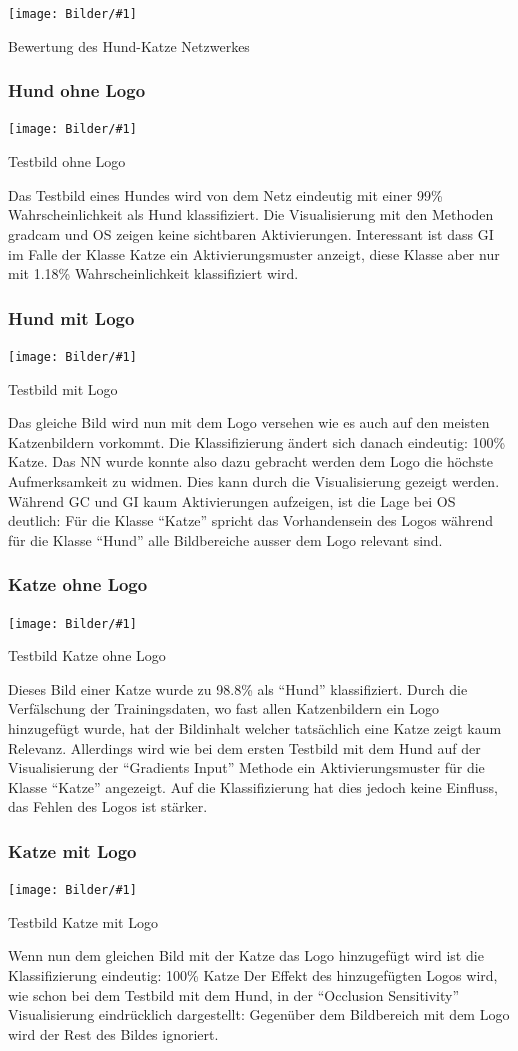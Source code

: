 \documentclass[
  12pt, %
  a4paper, %
  oneside, %
  openany, 
  numbers=noenddot, %
  BCOR=5mm, %
  parskip=half*, %
  thesis, %
]{bfhbook}
\newcommand{\imgText}[3]{
\begin{center}
    \begin{minipage}[t]{0.6\textwidth}
    		\vspace{0pt}
		\texttt{[image: Bilder/\#1]}
		\caption{#2}
	\end{minipage}\hfill
    \begin{minipage}[t]{0.4\textwidth}
    		\vspace{5pt}
  		#3
    \end{minipage}
\end{center}
}
\begin{document}
\imgText{Training-Manipulated-StatisticsTable.png}{Bewertung des Hund-Katze Netzwerkes}{

}

\subsubsection*{Hund ohne Logo}
\imgText{Manipulated_case_img7.png}{Testbild ohne Logo}{
Das Testbild eines Hundes wird von dem Netz eindeutig mit einer 99\% Wahrscheinlichkeit als Hund klassifiziert.
\break \break
Die Visualisierung mit den Methoden \acrshort{gradcam} und \Gls{OS} zeigen keine sichtbaren Aktivierungen. 
Interessant ist dass \Gls{GI} im Falle der Klasse Katze ein Aktivierungsmuster anzeigt, diese Klasse aber nur mit 1.18\% Wahrscheinlichkeit klassifiziert wird.
}

\subsubsection*{Hund mit Logo}
\imgText{Manipulated_case_img8.png}{Testbild mit Logo}{
Das gleiche Bild wird nun mit dem Logo versehen wie es auch auf den meisten Katzenbildern vorkommt. \break \break 
Die Klassifizierung ändert sich danach eindeutig: 100\% Katze. Das \Gls{NN} wurde konnte also dazu gebracht werden dem Logo die höchste Aufmerksamkeit zu widmen. 
\break \break
Dies kann durch die Visualisierung gezeigt werden. Während \Gls{GC} und \Gls{GI} kaum Aktivierungen aufzeigen, ist die Lage bei \Gls{OS} deutlich: Für die Klasse ``Katze'' spricht das Vorhandensein des Logos während für die Klasse ``Hund'' alle Bildbereiche ausser dem Logo relevant sind.
}

\subsubsection*{Katze ohne Logo}
\imgText{Manipulated_case_img4.png}{Testbild Katze ohne Logo}{
Dieses Bild einer Katze wurde zu 98.8\% als ``Hund'' klassifiziert. Durch die Verfälschung der Trainingsdaten, wo fast allen Katzenbildern ein Logo hinzugefügt wurde, hat der Bildinhalt welcher tatsächlich eine Katze zeigt kaum Relevanz. 
\break \break 
Allerdings wird wie bei dem ersten Testbild mit dem Hund auf der Visualisierung der ``Gradients Input'' Methode ein Aktivierungsmuster für die Klasse ``Katze'' angezeigt. Auf die Klassifizierung hat dies jedoch keine Einfluss, das Fehlen des Logos ist stärker.
}

\subsubsection*{Katze mit Logo}
\imgText{Manipulated_case_img5.png}{Testbild Katze mit Logo}{Wenn nun dem gleichen Bild mit der Katze das Logo hinzugefügt wird ist die Klassifizierung eindeutig: 100\% Katze
\break \break
Der Effekt des hinzugefügten Logos wird, wie schon bei dem Testbild mit dem Hund,  in der ``Occlusion Sensitivity'' Visualisierung eindrücklich dargestellt: Gegenüber dem Bildbereich mit dem Logo wird der Rest des Bildes ignoriert.
}
\end{document}
